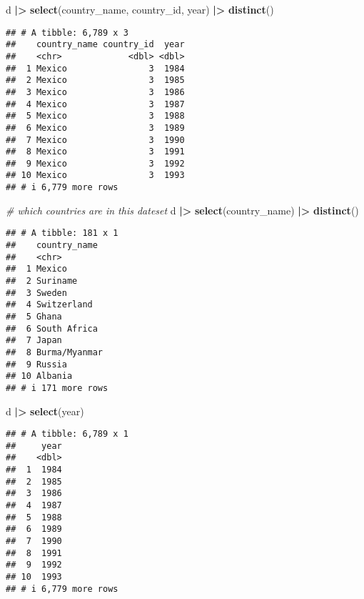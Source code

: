 \documentclass[
]{article}
\newenvironment{Shaded}{\begin{snugshade}}{\end{snugshade}}
\newcommand{\CommentTok}[1]{\textcolor[rgb]{0.56,0.35,0.01}{\textit{#1}}}
\newcommand{\FunctionTok}[1]{\textcolor[rgb]{0.13,0.29,0.53}{\textbf{#1}}}
\newcommand{\NormalTok}[1]{#1}
\newcommand{\SpecialCharTok}[1]{\textcolor[rgb]{0.81,0.36,0.00}{\textbf{#1}}}
\begin{document}
\begin{Shaded}
\begin{Highlighting}[]
\NormalTok{d }\SpecialCharTok{|\textgreater{}} \FunctionTok{select}\NormalTok{(country\_name, country\_id, year) }\SpecialCharTok{|\textgreater{}}
  \FunctionTok{distinct}\NormalTok{()}
\end{Highlighting}
\end{Shaded}

\begin{verbatim}
## # A tibble: 6,789 x 3
##    country_name country_id  year
##    <chr>             <dbl> <dbl>
##  1 Mexico                3  1984
##  2 Mexico                3  1985
##  3 Mexico                3  1986
##  4 Mexico                3  1987
##  5 Mexico                3  1988
##  6 Mexico                3  1989
##  7 Mexico                3  1990
##  8 Mexico                3  1991
##  9 Mexico                3  1992
## 10 Mexico                3  1993
## # i 6,779 more rows
\end{verbatim}

\begin{Shaded}
\begin{Highlighting}[]
\CommentTok{\# which countries are in this dateset}
\NormalTok{d }\SpecialCharTok{|\textgreater{}} \FunctionTok{select}\NormalTok{(country\_name) }\SpecialCharTok{|\textgreater{}} \FunctionTok{distinct}\NormalTok{()}
\end{Highlighting}
\end{Shaded}

\begin{verbatim}
## # A tibble: 181 x 1
##    country_name 
##    <chr>        
##  1 Mexico       
##  2 Suriname     
##  3 Sweden       
##  4 Switzerland  
##  5 Ghana        
##  6 South Africa 
##  7 Japan        
##  8 Burma/Myanmar
##  9 Russia       
## 10 Albania      
## # i 171 more rows
\end{verbatim}

\begin{Shaded}
\begin{Highlighting}[]
\NormalTok{d }\SpecialCharTok{|\textgreater{}} \FunctionTok{select}\NormalTok{(year)}
\end{Highlighting}
\end{Shaded}

\begin{verbatim}
## # A tibble: 6,789 x 1
##     year
##    <dbl>
##  1  1984
##  2  1985
##  3  1986
##  4  1987
##  5  1988
##  6  1989
##  7  1990
##  8  1991
##  9  1992
## 10  1993
## # i 6,779 more rows
\end{verbatim}
\end{document}
